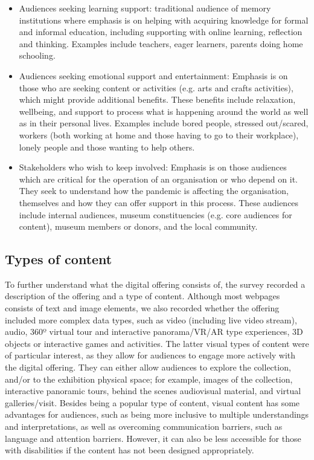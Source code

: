 \documentclass{egpubl}
\begin{document}
\begin{itemize}
	\item Audiences seeking learning support: traditional audience of memory institutions where emphasis is on helping with acquiring knowledge for formal and informal education, including supporting with online learning, reflection and thinking. Examples include teachers, eager learners, parents doing home schooling.
	\item Audiences seeking emotional support and entertainment: Emphasis is on those who are seeking content or activities (e.g. arts and crafts activities), which might provide additional benefits. These benefits include relaxation, wellbeing, and support to process what is happening around the world as well as in their personal lives. Examples include bored people, stressed out/scared, workers (both working at home and those having to go to their workplace), lonely people and those wanting to help others. 
	\item Stakeholders who wish to keep involved: Emphasis is on those audiences which are critical for the operation of an organisation or who depend on it. They seek to understand how the pandemic is affecting the organisation, themselves and how they can offer support in this process. These audiences include internal audiences, museum constituencies (e.g. core audiences for content), museum members or donors, and the local community.
\end{itemize}


\subsection{Types of content}
\label{typ}
To further understand what the digital offering consists of, the survey recorded a description of the offering and a type of content. Although most webpages consists of text and image elements, we also recorded whether the offering included more complex data types, such as video (including live video stream), audio, 360º virtual tour and interactive panorama/VR/AR type experiences, 3D objects or interactive games and activities. The latter visual types of content were of particular interest, as they allow for audiences to engage more actively with the digital offering. They can either allow audiences to explore the collection, and/or to the exhibition physical space; for example, images of the collection, interactive panoramic tours,  behind the scenes audiovisual material, and virtual galleries/visit. Besides being a popular type of content, visual content has some advantages for audiences, such as being more inclusive to multiple understandings and interpretations, as well as overcoming communication barriers, such as language and attention barriers. However, it can also be less accessible for those with disabilities if the content has not been designed appropriately.
\end{document}
